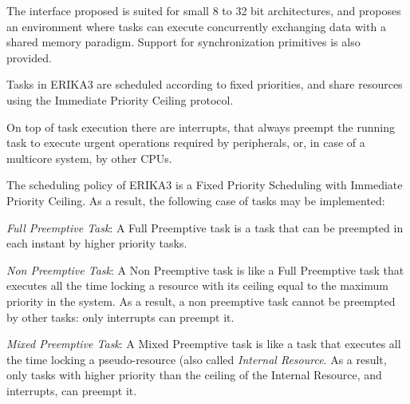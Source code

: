 The interface proposed is suited for small 8 to 32 bit architectures, and proposes an environment where tasks can execute concurrently exchanging data with a shared memory paradigm. Support for synchronization primitives is also provided.

Tasks in E\+R\+I\+K\+A3 are scheduled according to fixed priorities, and share resources using the Immediate Priority Ceiling protocol.

On top of task execution there are interrupts, that always preempt the running task to execute urgent operations required by peripherals, or, in case of a multicore system, by other C\+P\+Us.

The scheduling policy of E\+R\+I\+K\+A3 is a Fixed Priority Scheduling with Immediate Priority Ceiling. As a result, the following case of tasks may be implemented\+:


\begin{DoxyItemize}
\item {\itshape Full Preemptive Task}\+: A Full Preemptive task is a task that can be preempted in each instant by higher priority tasks.
\item {\itshape Non Preemptive Task}\+: A Non Preemptive task is like a Full Preemptive task that executes all the time locking a resource with its ceiling equal to the maximum priority in the system. As a result, a non preemptive task cannot be preempted by other tasks\+: only interrupts can preempt it.
\item {\itshape Mixed Preemptive Task}\+: A Mixed Preemptive task is like a task that executes all the time locking a pseudo-\/resource (also called {\itshape Internal Resource}. As a result, only tasks with higher priority than the ceiling of the Internal Resource, and interrupts, can preempt it. 
\end{DoxyItemize}